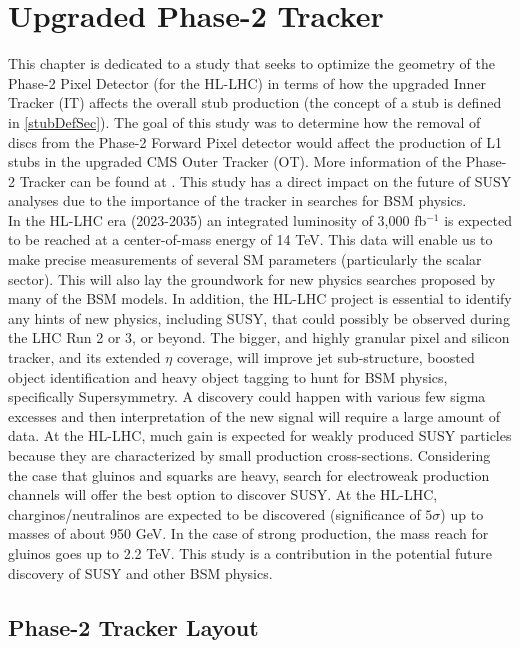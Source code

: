 \section{Upgraded Phase-2 Tracker}

This chapter is dedicated to a study that seeks to optimize the geometry of the Phase-2 Pixel Detector (for the HL-LHC) in terms of how the upgraded Inner Tracker (IT) affects the overall stub production (the concept of a stub is defined in \autoref{stubDefSec}). The goal of this study was to determine how the removal of discs from the Phase-2 Forward Pixel detector would affect the production of L1 stubs in the upgraded CMS Outer Tracker (OT). More information of the Phase-2 Tracker can be found at \cite{Phase2Tracker1}. This study has a direct impact on the future of SUSY analyses due to the importance of the tracker in searches for BSM physics.\\

In the HL-LHC era (2023-2035) an integrated luminosity of 3,000 fb$^{-1}$ is expected to be reached at a center-of-mass energy of 14 TeV. This data will enable us to make precise measurements of several SM parameters (particularly the scalar sector). This will also lay the groundwork for new physics searches proposed by many of the BSM models. In addition, the HL-LHC project is essential to identify any hints of new physics, including SUSY, that could possibly be observed during the LHC Run 2 or 3, or beyond. The bigger, and highly granular pixel and silicon tracker, and its extended $\eta$ coverage, will improve jet sub-structure, boosted object identification and heavy object tagging to hunt for BSM physics, specifically Supersymmetry. A discovery could happen with various few sigma excesses and then interpretation of the new signal will require a large amount of data. At the HL-LHC, much gain is expected for weakly produced SUSY particles because they are characterized by small production cross-sections. Considering the case that gluinos and squarks are heavy, search for electroweak production channels will offer the best option to discover SUSY. At the HL-LHC, charginos/neutralinos are expected to be discovered (significance of $5\sigma$) up to masses of about 950 GeV. In the case of strong production, the mass reach for gluinos goes up to 2.2 TeV. This study is a contribution in the potential future discovery of SUSY and other BSM physics.

\subsection{Phase-2 Tracker Layout}

